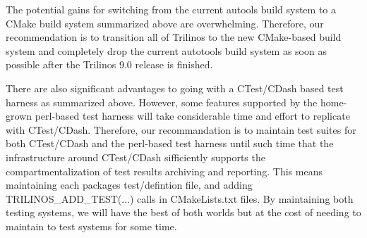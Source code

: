 \documentclass[pdf,ps2pdf,11pt]{SANDreport}
\begin{document}
The potential gains for switching from the current autools build
system to a CMake build system summarized above are overwhelming.
Therefore, our recommendation is to transition all of Trilinos to the
new CMake-based build system and completely drop the current autotools
build system as soon as possible after the Trilinos 9.0 release is
finished.

There are also significant advantages to going with a CTest/CDash
based test harness as summarized above.  However, some features
supported by the home-grown perl-based test harness will take
considerable time and effort to replicate with CTest/CDash.
Therefore, our recommandation is to maintain test suites for both
CTest/CDash and the perl-based test harness until such time that the
infrastructure around CTest/CDash sifficiently supports the
compartmentalization of test results archiving and reporting.  This
means maintaining each packages test/defintion file, and adding
TRILINOS\_ADD\_TEST(...) calls in CMakeLists.txt files.  By
maintaining both testing systems, we will have the best of both worlds
but at the cost of needing to maintain to test systems for some time.


%
\clearpage




\begin{SANDdistribution}[NM]
\end{SANDdistribution}
\end{document}
